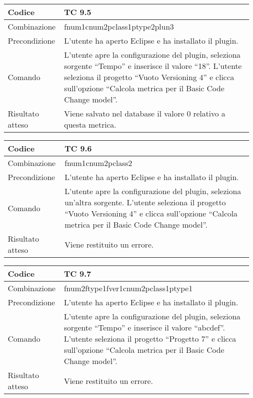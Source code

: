 \begin{table}[ht]
\begin{tabular}{|p{3cm}|p{9cm}|}
\hline
\cellcolor{lightgray}Codice				& TC 9.5								\\
\hline
\cellcolor{lightgray}Combinazione		& fnum1cnum2pclass1ptype2plun3									\\
\hline
\cellcolor{lightgray}Precondizione		& L'utente ha aperto Eclipse e ha installato il plugin.		\\
\hline
\cellcolor{lightgray}Comando			& L'utente apre la configurazione del plugin, seleziona sorgente ``Tempo'' e inserisce il valore ``18''. L'utente seleziona il progetto ``Vuoto Versioning 4''  e clicca sull'opzione ``Calcola metrica per il Basic Code Change model''.	\\
\hline
\cellcolor{lightgray}Risultato atteso	& Viene salvato nel database il valore 0 relativo a questa metrica.\\
\hline
\end{tabular}
\end{table}


\begin{table}[ht]
\begin{tabular}{|p{3cm}|p{9cm}|}
\hline
\cellcolor{lightgray}Codice				& TC 9.6								\\
\hline
\cellcolor{lightgray}Combinazione		& fnum1cnum2pclass2									\\
\hline
\cellcolor{lightgray}Precondizione		& L'utente ha aperto Eclipse e ha installato il plugin.		\\
\hline
\cellcolor{lightgray}Comando			& L'utente apre la configurazione del plugin, seleziona un'altra sorgente. L'utente seleziona il progetto ``Vuoto Versioning 4''  e clicca sull'opzione ``Calcola metrica per il Basic Code Change model''.	\\
\hline
\cellcolor{lightgray}Risultato atteso	& Viene restituito un errore.\\
\hline
\end{tabular}
\end{table}

\clearpage

\begin{table}[ht]
\begin{tabular}{|p{3cm}|p{9cm}|}
\hline
\cellcolor{lightgray}Codice				& TC 9.7								\\
\hline
\cellcolor{lightgray}Combinazione		& fnum2ftype1fver1cnum2pclass1ptype1									\\
\hline
\cellcolor{lightgray}Precondizione		& L'utente ha aperto Eclipse e ha installato il plugin.		\\
\hline
\cellcolor{lightgray}Comando			& L'utente apre la configurazione del plugin, seleziona sorgente ``Tempo'' e inserisce il valore ``abcdef''. L'utente seleziona il progetto ``Progetto 7''  e clicca sull'opzione ``Calcola metrica per il Basic Code Change model''.	\\
\hline
\cellcolor{lightgray}Risultato atteso	& Viene restituito un errore.\\
\hline
\end{tabular}
\end{table}

